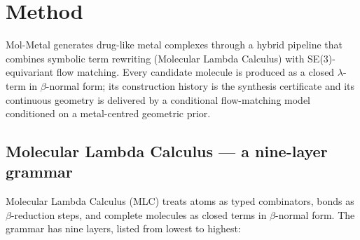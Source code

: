 \documentclass[10pt]{article}
\begin{document}
\section{Method}

Mol-Metal generates drug-like metal complexes through a hybrid pipeline that
combines symbolic term rewriting (Molecular Lambda Calculus) with
SE(3)-equivariant flow matching.  Every candidate molecule is produced as a
closed $\lambda$-term in $\beta$-normal form; its construction history is the
synthesis certificate and its continuous geometry is delivered by a conditional
flow-matching model conditioned on a metal-centred geometric prior.

\subsection{Molecular Lambda Calculus --- a nine-layer grammar}

Molecular Lambda Calculus (MLC) treats atoms as typed combinators, bonds as
$\beta$-reduction steps, and complete molecules as closed terms in
$\beta$-normal form.  The grammar has nine layers, listed from lowest to
highest:
\end{document}
